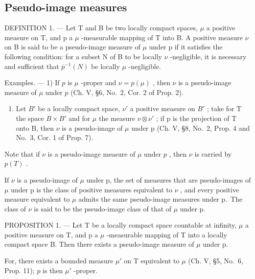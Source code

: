 \subsection{Pseudo-image measures}

DEFINITION 1. --- Let T and B be two locally compact spaces, \(\mu\) a positive measure on T, and p a \(\mu\) -measurable mapping of T into B. A positive measure \(\nu\) on B is said to be a pseudo-image measure of \(\mu\) under p if it satisfies the following condition: for a subset N of B to be locally \(\nu\) -negligible, it is necessary and sufficient that \(\overline{p}^{-1}(N)\) be locally \(\mu\) -negligible.

Examples. --- 1) If \(p\) is \(\mu\) -proper and \(\nu = p(\mu)\) , then \(\nu\) is a pseudo-image measure of \(\mu\) under \(p\) (Ch. V, §6, No.~2, Cor. 2 of Prop. 2).

\begin{enumerate}
\def\labelenumi{\arabic{enumi})}
\setcounter{enumi}{1}
\tightlist
\item
  Let \(B'\) be a locally compact space, \(\nu'\) a positive measure on \(B'\) ; take for T the space \(B \times B'\) and for \(\mu\) the measure \(\nu \otimes \nu'\) ; if p is the projection of T onto B, then \(\nu\) is a pseudo-image of \(\mu\) under p (Ch. V, §8, No.~2, Prop. 4 and No.~3, Cor. 1 of Prop. 7).
\end{enumerate}

Note that if \(\nu\) is a pseudo-image measure of \(\mu\) under \(p\) , then \(\nu\) is carried by \(p(T)\) .

If \(\nu\) is a pseudo-image of \(\mu\) under p, the set of measures that are pseudo-images of \(\mu\) under p is the class of positive measures equivalent to \(\nu\) , and every positive measure equivalent to \(\mu\) admits the same pseudo-image measures under p.~The class of \(\nu\) is said to be the pseudo-image class of that of \(\mu\) under p.

PROPOSITION 1. --- Let T be a locally compact space countable at infinity, \(\mu\) a positive measure on T, and p a \(\mu\) -measurable mapping of T into a locally compact space B. Then there exists a pseudo-image measure of \(\mu\) under p.

For, there exists a bounded measure \(\mu'\) on T equivalent to \(\mu\) (Ch. V, §5, No.~6, Prop. 11); \(p\) is then \(\mu'\) -proper.

